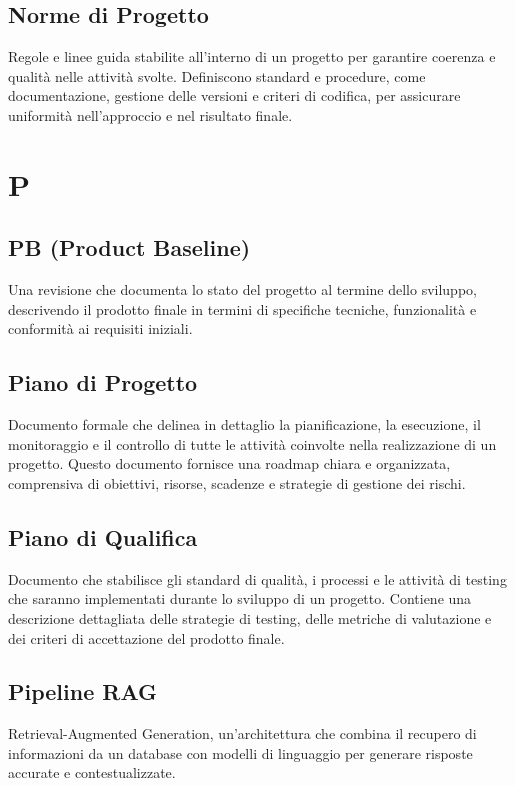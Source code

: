 \documentclass{article}
\begin{document}
\subsection{Norme di Progetto}
Regole e linee guida stabilite all'interno di un progetto per garantire coerenza e qualità nelle attività svolte. Definiscono standard e procedure, come documentazione, gestione delle versioni e criteri di codifica, per assicurare uniformità nell'approccio e nel risultato finale.

\newpage

\section{P}

\subsection{PB (Product Baseline)}
Una revisione che documenta lo stato del progetto al termine dello sviluppo, descrivendo il prodotto finale in termini di specifiche tecniche, funzionalità e conformità ai requisiti iniziali.

\subsection{Piano di Progetto}
Documento formale che delinea in dettaglio la pianificazione, la esecuzione, il monitoraggio e il controllo di tutte le attività coinvolte nella realizzazione di un progetto. Questo documento fornisce una roadmap chiara e organizzata, comprensiva di obiettivi, risorse, scadenze e strategie di gestione dei rischi.

\subsection{Piano di Qualifica}
Documento che stabilisce gli standard di qualità, i processi e le attività di testing che saranno implementati durante lo sviluppo di un progetto. Contiene una descrizione dettagliata delle strategie di testing, delle metriche di valutazione e dei criteri di accettazione del prodotto finale.

\subsection{Pipeline RAG}
Retrieval-Augmented Generation, un'architettura che combina il recupero di informazioni da un database con modelli di linguaggio per generare risposte accurate e contestualizzate.
\end{document}
